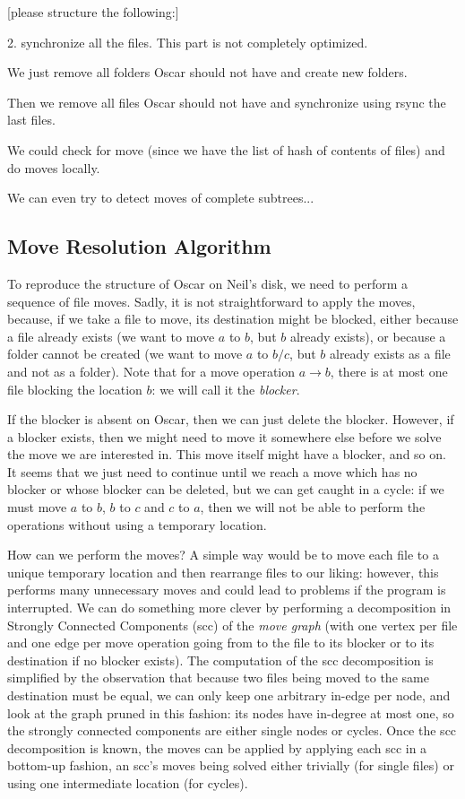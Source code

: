 \documentclass[11pt]{llncs}
\begin{document}
[please structure the following:]\smallskip

2. synchronize all the files. This part is not completely optimized.\smallskip

We just remove all folders Oscar should not have and create new folders.\smallskip

Then we remove all files Oscar should not have and synchronize using rsync the last files.\smallskip

We could check for move (since we have the list of hash of contents of files) and do moves locally.\smallskip

We can even try to detect moves of complete subtrees...\smallskip


\subsection{Move Resolution Algorithm}

To reproduce the structure of Oscar on Neil's disk, we need to perform a sequence of file moves. Sadly, it is not straightforward to apply the moves, because, if we take a file to move, its destination might be blocked, either because a file already exists (we want to move $a$ to $b$, but $b$ already exists), or because a folder cannot be created (we want to move $a$ to $b/c$, but $b$ already exists as a file and not as a folder). Note that for a move operation $a \rightarrow b$, there is at most one file blocking the location $b$: we will call it the {\sl blocker}.

If the blocker is absent on Oscar, then we can just delete the blocker. However, if a blocker exists, then we might need to move it somewhere else before we solve the move we are interested in. This move itself might have a blocker, and so on. It seems that we just need to continue until we reach a move which has no blocker or whose blocker can be deleted, but we can get caught in a cycle: if we must move $a$ to $b$, $b$ to $c$ and $c$ to $a$, then we will not be able to perform the operations without using a temporary location.

How can we perform the moves? A simple way would be to move each file to a unique temporary location and then rearrange files to our liking: however, this performs many unnecessary moves and could lead to problems if the program is interrupted. We can do something more clever by performing a decomposition in Strongly Connected Components ({\sc scc}) of the {\sl move graph} (with one vertex per file and one edge per move operation going from to the file to its blocker or to its destination if no blocker exists). The computation of the {\sc scc} decomposition is simplified by the observation that because two files being moved to the same destination must be equal, we can only keep one arbitrary in-edge per node, and look at the graph pruned in this fashion: its nodes have in-degree at most one, so the strongly connected components are either single nodes or cycles. Once the {\sc scc} decomposition is known, the moves can be applied by applying each {\sc scc} in a bottom-up fashion, an {\sc scc}'s moves being solved either trivially (for single files) or using one intermediate location (for cycles).
\end{document}
